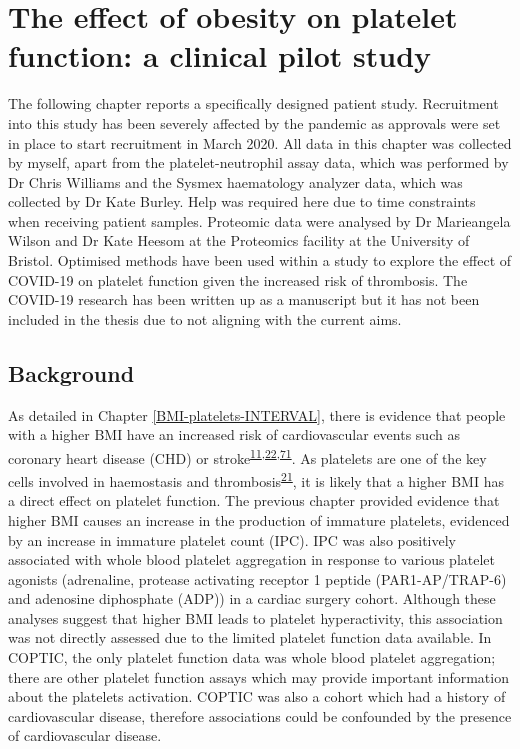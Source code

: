 \documentclass[11pt,twoside]{bristolthesis}
\begin{document}
\hypertarget{BMI-platelets-clinic}{%
\chapter{The effect of obesity on platelet function: a clinical pilot study}\label{BMI-platelets-clinic}}

The following chapter reports a specifically designed patient study. Recruitment into this study has been severely affected by the pandemic as approvals were set in place to start recruitment in March 2020. All data in this chapter was collected by myself, apart from the platelet-neutrophil assay data, which was performed by Dr Chris Williams and the Sysmex haematology analyzer data, which was collected by Dr Kate Burley. Help was required here due to time constraints when receiving patient samples. Proteomic data were analysed by Dr Marieangela Wilson and Dr Kate Heesom at the Proteomics facility at the University of Bristol. Optimised methods have been used within a study to explore the effect of COVID-19 on platelet function given the increased risk of thrombosis. The COVID-19 research has been written up as a manuscript but it has not been included in the thesis due to not aligning with the current aims.

\hypertarget{background-2}{%
\section{Background}\label{background-2}}

As detailed in Chapter \ref{BMI-platelets-INTERVAL}, there is evidence that people with a higher BMI have an increased risk of cardiovascular events such as coronary heart disease (CHD) or stroke\textsuperscript{\protect\hyperlink{ref-Nordestgaard2012}{11},\protect\hyperlink{ref-Dale2017}{22},\protect\hyperlink{ref-Wolk2003a}{71}}. As platelets are one of the key cells involved in haemostasis and thrombosis\textsuperscript{\protect\hyperlink{ref-Koupenova2017a}{21}}, it is likely that a higher BMI has a direct effect on platelet function. The previous chapter provided evidence that higher BMI causes an increase in the production of immature platelets, evidenced by an increase in immature platelet count (IPC). IPC was also positively associated with whole blood platelet aggregation in response to various platelet agonists (adrenaline, protease activating receptor 1 peptide (PAR1-AP/TRAP-6) and adenosine diphosphate (ADP)) in a cardiac surgery cohort. Although these analyses suggest that higher BMI leads to platelet hyperactivity, this association was not directly assessed due to the limited platelet function data available. In COPTIC, the only platelet function data was whole blood platelet aggregation; there are other platelet function assays which may provide important information about the platelets activation. COPTIC was also a cohort which had a history of cardiovascular disease, therefore associations could be confounded by the presence of cardiovascular disease.
\end{document}
